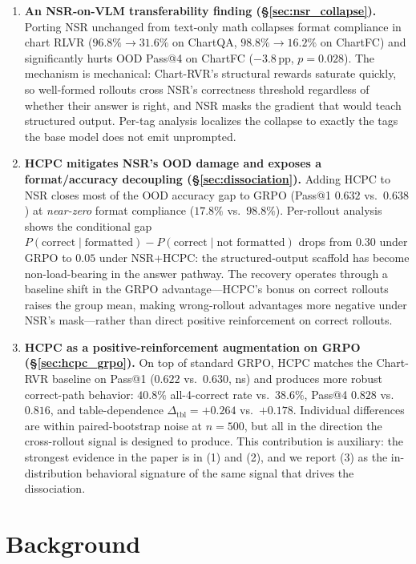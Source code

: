 \documentclass[11pt]{article}
\begin{document}
\begin{enumerate}
    \item \textbf{An NSR-on-VLM transferability finding
    (\S\ref{sec:nsr_collapse}).} Porting NSR unchanged from
    text-only math collapses format compliance in chart RLVR
    ($96.8\%{\to}31.6\%$ on ChartQA, $98.8\%{\to}16.2\%$ on ChartFC)
    and significantly hurts OOD Pass@4 on ChartFC
    ($-3.8$\,pp, $p{=}0.028$). The mechanism is mechanical:
    Chart-RVR's structural rewards saturate quickly, so well-formed
    rollouts cross NSR's correctness threshold regardless of whether
    their answer is right, and NSR masks the gradient that would
    teach structured output. Per-tag analysis localizes the collapse
    to exactly the tags the base model does not emit unprompted.
    \item \textbf{HCPC mitigates NSR's OOD damage and exposes a
    format/accuracy decoupling (\S\ref{sec:dissociation}).} Adding
    HCPC to NSR closes most of the OOD accuracy gap to GRPO
    (Pass@1 $0.632$ vs.\ $0.638$) at \emph{near-zero} format
    compliance ($17.8\%$ vs.\ $98.8\%$). Per-rollout analysis shows
    the conditional gap
    $P(\text{correct}\mid\text{formatted}){-}P(\text{correct}\mid\text{not formatted})$
    drops from $0.30$ under GRPO to $0.05$ under NSR+HCPC: the
    structured-output scaffold has become non-load-bearing in the
    answer pathway. The recovery operates through a baseline shift
    in the GRPO advantage---HCPC's bonus on correct rollouts raises
    the group mean, making wrong-rollout advantages more negative
    under NSR's mask---rather than direct positive reinforcement on
    correct rollouts.
    \item \textbf{HCPC as a positive-reinforcement augmentation on
    GRPO (\S\ref{sec:hcpc_grpo}).} On top of standard GRPO, HCPC
    matches the Chart-RVR baseline on Pass@1
    ($0.622$ vs.\ $0.630$, ns) and produces more robust correct-path
    behavior: $40.8\%$ all-4-correct rate vs.\ $38.6\%$, Pass@4
    $0.828$ vs.\ $0.816$, and table-dependence
    $\Delta_{\text{tbl}}{=}{+}0.264$ vs.\ ${+}0.178$. Individual
    differences are within paired-bootstrap noise at $n{=}500$, but
    all in the direction the cross-rollout signal is designed to
    produce. This contribution is auxiliary: the strongest evidence
    in the paper is in (1) and (2), and we report (3) as the
    in-distribution behavioral signature of the same signal that
    drives the dissociation.
\end{enumerate}

\section{Background}
\label{sec:background}
\end{document}
